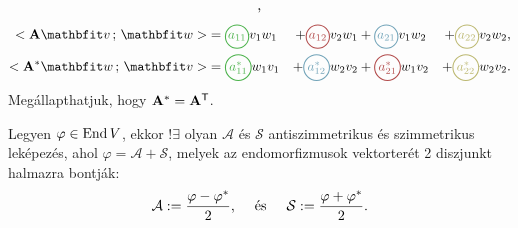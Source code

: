 \documentclass[lang=magyar]{math-handout}
\begin{document}
\begin{note}
\begin{align*}
    \text,
  \end{align*}
  \begin{alignat*}{4}
    \scalar{\rmat{A}\rvec{v}}{\rvec{w}}
     & = \circled{$a_{11}$}{green!40!gray} v_1 w_1
     & + \circled{$a_{12}$}{red!40!gray} v_2 w_1
     & + \circled{$a_{21}$}{cyan!40!gray} v_1 w_2
     & + \circled{$a_{22}$}{yellow!40!gray} v_2 w_2
    \text,
    \\
    \scalar{\rmat{A}^{*}\rvec{w}}{\rvec{v}}
     & = \circled{$a_{11}^{*}$}{green!40!gray} w_1 v_1
     & + \circled{$a_{12}^{*}$}{cyan!40!gray} w_2 v_2
     & + \circled{$a_{21}^{*}$}{red!40!gray} w_1 v_2
     & + \circled{$a_{22}^{*}$}{yellow!40!gray} w_2 v_2
    \text.
  \end{alignat*}
  Megállapthatjuk, hogy $\mathbf{A}^{*} = \mathbf{A}^{\mathsf{T}}$.
\end{note}

\begin{statement}
  Legyen $\varphi \in \operatorname{End} V$, ekkor $!\exists$ olyan $\mathcal{A}$ és
  $\mathcal{S}$ antiszimmetrikus és szimmetrikus leképezés, ahol $\varphi =
    \mathcal{A} + \mathcal{S}$, melyek az endomorfizmusok vektorterét 2
  diszjunkt halmazra bontják:
  \[
    \mathcal{A} := \frac{\varphi - \varphi^{*}}{2}
    \text,
    \hspace{5mm} \text{és} \hspace{5mm}
    \mathcal{S} := \frac{\varphi + \varphi^{*}}{2}
    \text.
  \]
\end{statement}
\end{document}
